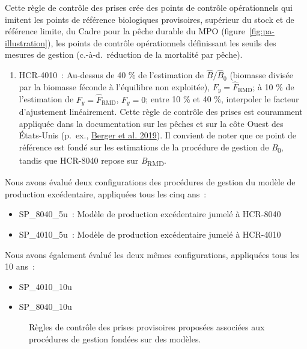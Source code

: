 \documentclass[french,11pt]{book}
\begin{document}
Cette règle de contrôle des prises crée des points de contrôle opérationnels qui imitent les points de référence biologiques provisoires, supérieur du stock et de référence limite, du Cadre pour la pêche durable du MPO (figure~\ref{fig:pa-illustration}), les points de contrôle opérationnels définissant les seuils des mesures de gestion (c.-à-d.~réduction de la mortalité par pêche).
\begin{enumerate}
\def\labelenumi{\arabic{enumi}.}
\setcounter{enumi}{1}

\item
  HCR-4010~: Au-dessus de 40 \% de l'estimation de \(\hat{B}/\hat{B}_0\) (biomasse divisée par la biomasse féconde à l'équilibre non exploitée), \(F_y = \hat{F}_\textrm{RMD}\); à 10 \% de l'estimation de \(F_y = \hat{F}_\textrm{RMD}\), \(F_y = 0\); entre 10 \% et 40 \%, interpoler le facteur d'ajustement linéairement. Cette règle de contrôle des prises est couramment appliquée dans la documentation sur les pêches et sur la côte Ouest des États-Unis (p.~ex., \protect\hyperlink{ref-berger_2019}{Berger et al. 2019}). Il convient de noter que ce point de référence est fondé sur les estimations de la procédure de gestion de \emph{B}\textsubscript{0}, tandis que HCR-8040 repose sur \emph{B}\textsubscript{RMD}.
\end{enumerate}
Nous avons évalué deux configurations des procédures de gestion du modèle de production excédentaire, appliquées tous les cinq ans~:
\begin{itemize}
\item
  SP\_8040\_5u~: Modèle de production excédentaire jumelé à HCR-8040
\item
  SP\_4010\_5u~: Modèle de production excédentaire jumelé à HCR-4010
\end{itemize}
Nous avons également évalué les deux mêmes configurations, appliquées tous les 10 ans~:
\begin{itemize}
\item
  SP\_4010\_10u
\item
  SP\_8040\_10u
\end{itemize}
\begin{figure}[htb]

{\centering {} 

}

\caption{Règles de contrôle des prises provisoires proposées associées aux procédures de gestion fondées sur des modèles.}\label{fig:mp-hcrs}
\end{figure}
\clearpage
\end{document}
